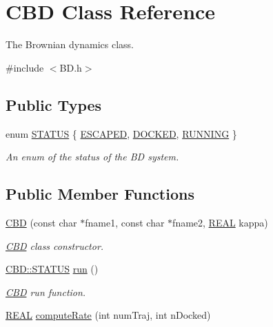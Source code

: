 \hypertarget{classCBD}{\section{C\-B\-D Class Reference}
\label{classCBD}
}


The Brownian dynamics class.  




{\ttfamily \#include $<$B\-D.\-h$>$}

\subsection*{Public Types}
\begin{DoxyCompactItemize}
\item 
enum \hyperlink{classCBD_ad133262cc326c96e755511655e632e57}{S\-T\-A\-T\-U\-S} \{ \hyperlink{classCBD_ad133262cc326c96e755511655e632e57a1a1bdce13ca045bee400064ec75a4ab7}{E\-S\-C\-A\-P\-E\-D}, 
\hyperlink{classCBD_ad133262cc326c96e755511655e632e57ac0a9f8a84559135662cf71c4893a99ef}{D\-O\-C\-K\-E\-D}, 
\hyperlink{classCBD_ad133262cc326c96e755511655e632e57a4ba124eb7b8e8a8c32491bc599f62851}{R\-U\-N\-N\-I\-N\-G}
 \}
\begin{DoxyCompactList}\small\item\em An enum of the status of the B\-D system. \end{DoxyCompactList}\end{DoxyCompactItemize}
\subsection*{Public Member Functions}
\begin{DoxyCompactItemize}
\item 
\hyperlink{classCBD_a9594e15571fc17a65dc1dbe8a0532971}{C\-B\-D} (const char $\ast$fname1, const char $\ast$fname2, \hyperlink{util_8h_a5821460e95a0800cf9f24c38915cbbde}{R\-E\-A\-L} kappa)
\begin{DoxyCompactList}\small\item\em \hyperlink{classCBD}{C\-B\-D} class constructor. \end{DoxyCompactList}\item 
\hyperlink{classCBD_ad133262cc326c96e755511655e632e57}{C\-B\-D\-::\-S\-T\-A\-T\-U\-S} \hyperlink{classCBD_a0e59f17fc428ea28a8c8b4c9656a3538}{run} ()
\begin{DoxyCompactList}\small\item\em \hyperlink{classCBD}{C\-B\-D} run function. \end{DoxyCompactList}\item 
\hyperlink{util_8h_a5821460e95a0800cf9f24c38915cbbde}{R\-E\-A\-L} \hyperlink{classCBD_afa41f280cb3eeb206e6e7c7e99332726}{compute\-Rate} (int num\-Traj, int n\-Docked)
\end{DoxyCompactItemize}
